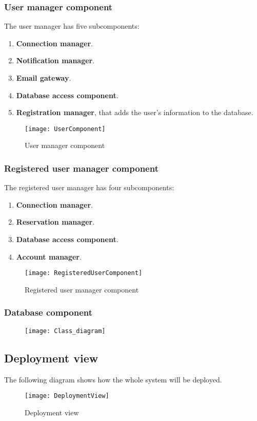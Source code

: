 \subsubsection{User manager component}
The user manager has five subcomponents:
\begin{enumerate}
	\item \textbf{Connection manager}.
	\item \textbf{Notification manager}.
	\item \textbf{Email gateway}.
	\item \textbf{Database access component}.
		\item \textbf{Registration manager}, that adds the user's information to the database.
\end{enumerate}
\begin{figure}[H]
	\centering
	\texttt{[image: UserComponent]}
	\caption{User manager component}
\end{figure}
\newpage
\subsubsection{Registered user manager component}
The registered user manager has four subcomponents:
\begin{enumerate}
	\item \textbf{Connection manager}.
	\item \textbf{Reservation manager}.
	\item \textbf{Database access component}.
	\item \textbf{Account manager}.
\end{enumerate}
\begin{figure}[H]
	\centering
	\texttt{[image: RegisteredUserComponent]}
	\caption{Registered user manager component}
\end{figure}
\subsubsection{Database component}
\begin{figure}[H]
	\centering
	\texttt{[image: Class\_diagram]}
\end{figure}
\subsection{Deployment view} 
The following diagram shows how the whole system will be deployed.
\begin{figure}[H]
	\centering
	\texttt{[image: DeploymentView]}
	\caption{Deployment view}
\end{figure} 
\newpage
